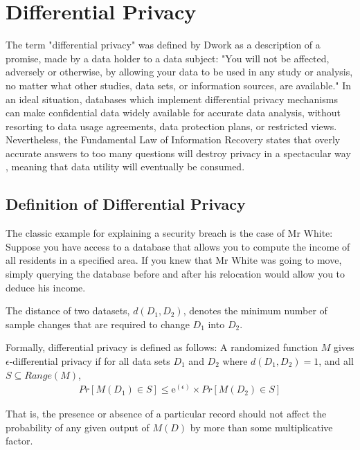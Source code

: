 \section{Differential Privacy}
\label{section:differential_privacy}
The term "differential privacy" was defined by Dwork as a description of a promise, made by a data holder to a data subject: "You will not be affected, adversely or otherwise, by allowing your data to be used in any study or analysis, no matter what other studies, data sets, or information sources, are available." \citep{dwork2013algorithmic}
In an ideal situation, databases which implement differential privacy mechanisms can make confidential data widely available for accurate data analysis, without resorting to data usage agreements, data protection plans, or restricted views. Nevertheless, the Fundamental Law of Information Recovery states that overly accurate answers to too many questions will destroy privacy in a spectacular way \citep{dwork2013algorithmic}, meaning that data utility will eventually be consumed.

\subsection{Definition of Differential Privacy}
The classic example for explaining a security breach is the case of Mr White: Suppose you have access to a database that allows you to compute the income of all residents in a specified area. If you knew that Mr White was going to move, simply querying the database before and after his relocation would allow you to deduce his income. 

\begin{definition} The distance of two datasets, $d(D_1, D_2)$, denotes the minimum number of sample changes that are required to change $D_1$ into $D_2$.
\end{definition}

Formally, differential privacy is defined as follows:
A randomized function $M$ gives $\epsilon$-differential privacy if for all data sets $D_1$ and $D_2$ where $d(D_1, D_2)=1$, and all $S\subseteq Range(M)$,
\begin{eqnarray} \label{DiffPrivDef}
 Pr[M(D_1)\in S]\leq \mathrm{e}^{(\epsilon)}\times Pr[M(D_2)\in S]
 \end{eqnarray}

That is, the presence or absence of a particular record should not affect the probability of any given output of $M(D)$ by more than some multiplicative factor. 

